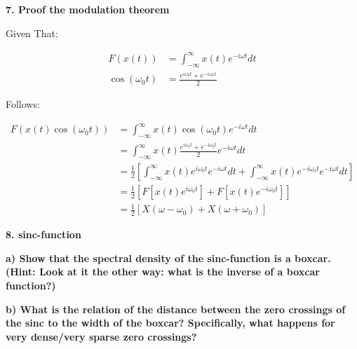 \newpage

\textbf{\large 7. Proof the modulation theorem}

Given That:

\begin{align}
	F(x(t)) &= \int_{-\infty}^\infty x(t) e^{-i \omega t} dt \\
	\cos(\omega_0 t) &= \frac{e^{i \omega_0 t} + e^{-i \omega_0 t}}{2}
\end{align}

Follows:

\begin{align*}
	F(x(t) \cos(\omega_0 t)) &= \int_{-\infty}^\infty x(t) \cos(\omega_0 t) e^{-i \omega t} dt \\
	&= \int_{-\infty}^\infty x(t) \frac{e^{i \omega_0 t} + e^{-i \omega_0 t}}{2} e^{-i \omega t} dt \\
	&= \frac{1}{2} \left[ \int_{-\infty}^\infty x(t) e^{i \omega_0 t} e^{-i \omega t} dt + \int_{-\infty}^\infty x(t) e^{-i \omega_0 t} e^{-i \omega t} dt \right] \\
	&= \frac{1}{2} \left[ F\left[x(t) e^{i \omega_0 t} \right] + F\left[x(t) e^{-i \omega_0 t} \right] \right] \\
	&= \frac{1}{2} \left[ X(\omega - \omega_0) + X(\omega + \omega_0) \right]
\end{align*}



\textbf{\large 8. sinc-function}

\textbf{
	a) Show that the spectral density of the sinc-function is a boxcar. 
	(Hint: Look at it the other way: what is the inverse of a boxcar function?)
} 

\textbf{
	b) What is the relation of the distance between the zero crossings of the sinc to the width of the boxcar? 
	Specifically, what happens for very dense/very sparse zero crossings?
}
